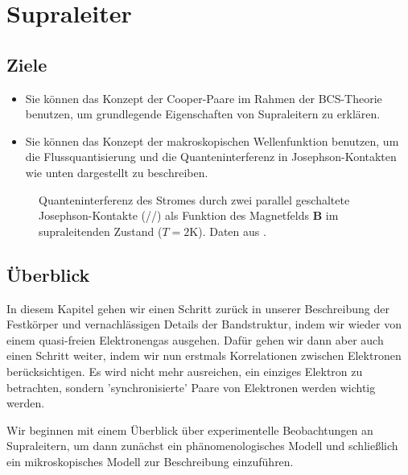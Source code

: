 \renewcommand{\chapterauthors}{Markus Lippitz}
\renewcommand{\lastmod}{16. Juni 2025}

\chapter{Supraleiter}




\section{Ziele}
 


\begin{itemize}
\item Sie können das Konzept der Cooper-Paare im Rahmen der BCS-Theorie benutzen, um grundlegende Eigenschaften von Supraleitern zu erklären.
\item Sie können das Konzept der makroskopischen Wellenfunktion benutzen, um die Flussquantisierung und die Quanteninterferenz in Josephson-Kontakten wie unten dargestellt zu beschreiben.
\end{itemize}

\begin{figure}
    \caption{Quanteninterferenz des Stromes durch zwei parallel geschaltete Josephson-Kontakte (//) als Funktion des Magnetfelds $\bm{B}$ im supraleitenden Zustand ($T=2$K). Daten aus \cite{Jaklevic1965}. \label{fig:6_squid_data}
}
\end{figure}




\section{Überblick}

In diesem Kapitel gehen wir einen Schritt zurück in unserer Beschreibung der Festkörper und vernachlässigen Details der Bandstruktur, indem wir wieder von einem quasi-freien Elektronengas ausgehen. Dafür gehen wir dann aber auch einen Schritt weiter, indem wir nun erstmals Korrelationen zwischen Elektronen berücksichtigen. Es wird nicht mehr ausreichen, ein einziges Elektron zu betrachten, sondern 'synchronisierte' Paare von Elektronen werden wichtig werden.

Wir beginnen mit einem Überblick über experimentelle Beobachtungen an Supraleitern, um dann zunächst ein phänomenologisches  Modell und schließlich ein mikroskopisches Modell zur Beschreibung einzuführen.

